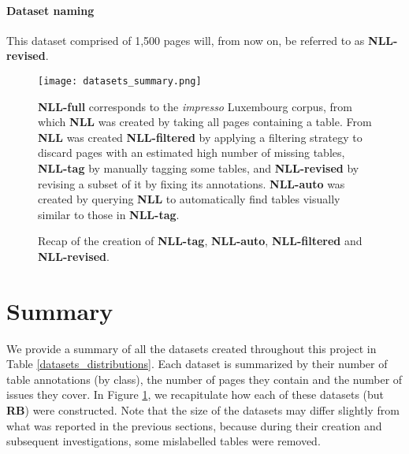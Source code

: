 \paragraph{Dataset naming}
This dataset comprised of 1,500 pages will, from now on, be referred to as \textbf{NLL-revised}.

\begin{figure}[h]
\centering
\texttt{[image: datasets\_summary.png]}
\caption{Recap of the creation of \textbf{NLL-tag}, \textbf{NLL-auto}, \textbf{NLL-filtered} and \textbf{NLL-revised}.}
\label{datasets_summary_schema}
\medskip
\small
\textbf{NLL-full} corresponds to the \textit{impresso} Luxembourg corpus, from which \textbf{NLL} was created by taking all pages containing a table. From \textbf{NLL} was created \textbf{NLL-filtered} by applying a filtering strategy to discard pages with an estimated high number of missing tables, \textbf{NLL-tag} by manually tagging some tables, and \textbf{NLL-revised} by revising a subset of it by fixing its annotations. \textbf{NLL-auto} was created by querying \textbf{NLL} to automatically find tables visually similar to those in \textbf{NLL-tag}. 
\end{figure}

\section{Summary}
\label{datasets_summary}
We provide a summary of all the datasets created throughout this project in Table \ref{datasets_distributions}. Each dataset is summarized by their number of table annotations (by class), the number of pages they contain and the number of issues they cover. In Figure \ref{datasets_summary_schema}, we recapitulate how each of these datasets (but \textbf{RB}) were constructed. Note that the size of the datasets may differ slightly from what was reported in the previous sections, because during their creation and subsequent investigations, some mislabelled tables were removed.

